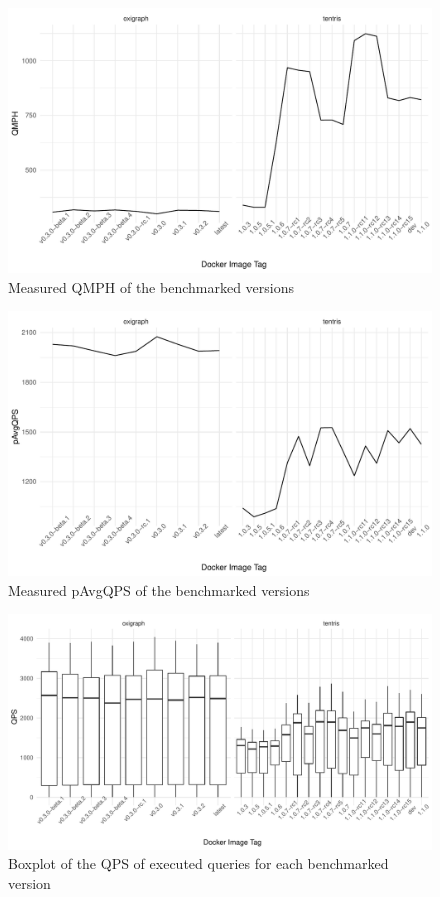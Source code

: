 \begin{figure}[tbph]
	\centering
	\includegraphics[width=.8\textwidth]{figures/QMPH.pdf}
	\caption{Measured QMPH of the benchmarked \ts{} versions}
	\label{fig:QMPH}
\end{figure}

\begin{figure}[tbph]
	\centering
	\includegraphics[width=.8\textwidth]{figures/pAvgQPS.pdf}
	\caption{Measured pAvgQPS of the benchmarked \ts{} versions}
	\label{fig:pAvgQPS}
\end{figure}

\begin{figure}[tbph]
	\centering
	\includegraphics[width=.9\textwidth]{figures/qps.pdf}
	\caption{Boxplot of the QPS of executed queries for each benchmarked \ts{} version}
	\label{fig:qps}
\end{figure}



